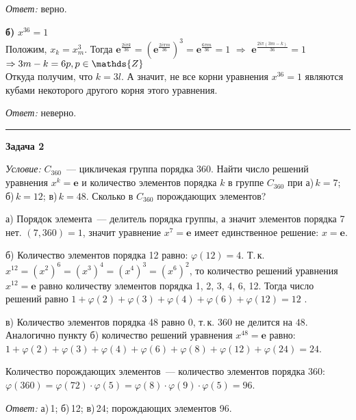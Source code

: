 \documentclass[12pt,a4paper]{article}
\newcommand{\sbs}{\large \bfseries}
\newcommand{\rl}{\vspace{16pt} \hrule \vspace{8pt}}
\newcommand{\ve}{\boldsymbol{e}}
\begin{document}
{\itshape Ответ: } верно.

\textbf{б)} $x^ {36} = 1$
\\Положим, $x_k=x_m^3$. Тогда $\displaystyle \ve^{\frac{2i\pi k}{36}}=(\ve^{\frac{2i\pi m}{36}})^{3}=\ve^{\frac{6\pi m}{36}}=1$ $\Rightarrow$ $\ve^{\frac{2i \pi (3m-k)}{36}}=1$ $\Rightarrow \\3m-k=6p,  p\in \mathds{Z}$
\\ Откуда получим, что $k = 3l$. А значит, не все корни уравнения $x^ {36} = 1$ являются кубами некоторого другого корня этого уравнения.

{\itshape Ответ: } неверно.





\rl
{\sbs Задача 2}

{\itshape Условие: } $C_{360}$~--- цикличекая группа порядка 360. Найти число решений уравнения $x^k=\boldsymbol{e}$ и количество элементов порядка $k$ в группе $C_{360}$ при а)\,$k = 7$; б)\,$k = 12$; в)\,$k = 48$. Сколько в $C_{360}$ порождающих элементов?

а) Порядок элемента~--- делитель порядка группы, а значит элементов порядка 7 нет. $(7, 360) = 1$, значит уравнение $x^7 = \boldsymbol{e}$ имеет единственное решение: $x = \boldsymbol{e}$.

б) Количество элементов порядка 12 равно: $\varphi (12) = 4$. Т.\,к. $x^{12} = (x^2)^6 = (x^3)^4 = (x^4)^3 = (x^6)^2$, то количество решений уравнения $x^{12} = \boldsymbol{e}$ равно количеству элементов порядка 1, 2, 3, 4, 6, 12. Тогда число решений равно $1 + \varphi(2) + \varphi(3) + \varphi(4) + \varphi(6) + \varphi(12) = 12$ .\par
в) Количество элементов порядка 48 равно 0, т.\,к. $360$ не делится на $48$. Аналогично пункту б) количество решений уравнения $x^{48} = \boldsymbol{e}$ равно:\\
$1 + \varphi(2) + \varphi(3) + \varphi(4) + \varphi(6) + \varphi(8) + \varphi(12) + \varphi(24) = 24$.\par
Количество порождающих элементов~--- количество элементов порядка 360:\\
$\varphi(360) = \varphi(72)\cdot\varphi(5) =\varphi(8)\cdot\varphi(9)\cdot\varphi(5) = 96$.

{\itshape Ответ: } а)\,1; б)\,12; в)\,24; порождающих элементов 96.
\end{document}
